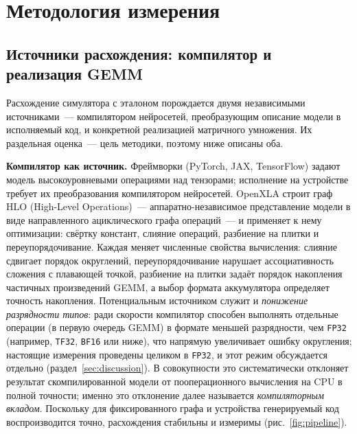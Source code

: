 \section{Методология измерения}
\label{sec:method}

\subsection{Источники расхождения: компилятор и реализация GEMM}
\label{sec:sources}

Расхождение симулятора с эталоном порождается двумя независимыми источниками~---
компилятором нейросетей, преобразующим описание модели в исполняемый код, и
конкретной реализацией матричного умножения. Их раздельная оценка~--- цель
методики, поэтому ниже описаны оба.

\textbf{Компилятор как источник.} Фреймворки (PyTorch, JAX, TensorFlow) задают
модель высокоуровневыми операциями над тензорами; исполнение на устройстве
требует их преобразования компилятором нейросетей. OpenXLA строит граф HLO
(High-Level Operations)~--- аппаратно-независимое представление модели в виде
направленного ациклического графа операций~--- и применяет к нему оптимизации:
свёртку констант, слияние операций, разбиение на плитки и переупорядочивание.
Каждая меняет численные свойства вычисления: слияние сдвигает порядок округлений,
переупорядочивание нарушает ассоциативность сложения с плавающей точкой,
разбиение на плитки задаёт порядок накопления частичных произведений GEMM, а
выбор формата аккумулятора определяет точность накопления. Потенциальным
источником служит и \emph{понижение разрядности типов}: ради скорости компилятор
способен выполнять отдельные операции (в первую очередь GEMM) в формате меньшей
разрядности, чем \texttt{FP32} (например, \texttt{TF32}, \texttt{BF16} или ниже),
что напрямую увеличивает ошибку округления; настоящие измерения проведены целиком
в \texttt{FP32}, и этот режим обсуждается отдельно (раздел~\ref{sec:discussion}).
В совокупности это
систематически отклоняет результат скомпилированной модели от пооперационного
вычисления на CPU в полной точности; именно это отклонение далее называется
\emph{компиляторным вкладом}. Поскольку для фиксированного графа и устройства
генерируемый код воспроизводится точно, расхождения стабильны и измеримы
(рис.~\ref{fig:pipeline}).

